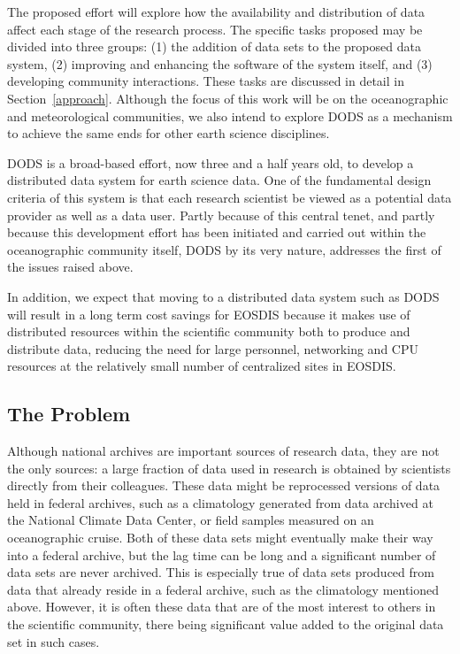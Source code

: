 \documentclass[12pt]{article}
\begin{document}
The proposed effort will explore how the availability and distribution
of data affect each stage of the research process.  The specific tasks
proposed may be divided into three groups: (1) the addition of data 
sets to the proposed data system, (2) improving and enhancing the
software of the system itself, and (3) developing community interactions.  
These tasks are discussed in detail in
Section~\ref{approach}.  Although the focus of this work will be on
the oceanographic and meteorological communities, we also intend to
explore \ac{DODS} as a mechanism to achieve the same ends for other
earth science disciplines.  

\ac{DODS} is a broad-based effort, now three and a half years old, to
develop a distributed data system for earth science data. One of the
fundamental design criteria of this system is that each research
scientist be viewed as a potential data provider as well as a data
user. Partly because of this central tenet, and partly because this
development effort has been initiated and carried out within the
oceanographic community itself, \ac{DODS} by its very nature,
addresses the first of the issues raised above.

In addition, we expect that moving to a distributed
data system such as \ac{DODS} will result in a long term cost savings 
for \acs{EOSDIS} because it makes use of distributed resources 
within the scientific community both to produce and distribute data,
reducing the need for large personnel, networking and \acs{CPU} resources at 
the relatively small number of centralized sites in \acs{EOSDIS}.

\subsection{The Problem}\label{problem}

Although national archives are important sources of research data,
they are not the only sources: a large fraction of data used in 
research is obtained by scientists
directly from their colleagues.  These data might be reprocessed
versions of data held in federal archives, such as a climatology
generated from data archived at the National Climate Data Center, or
field samples measured on an oceanographic cruise. Both of these data
sets might eventually make their way into a federal archive, but the
lag time can be long and a significant number of data sets are never
archived.  This is especially true of data sets produced from data
that already reside in a federal archive, such as the climatology
mentioned above. However, it is often these data that are of the
most interest to others in the scientific community, there being
significant value added to the original data set in such cases.
\end{document}
